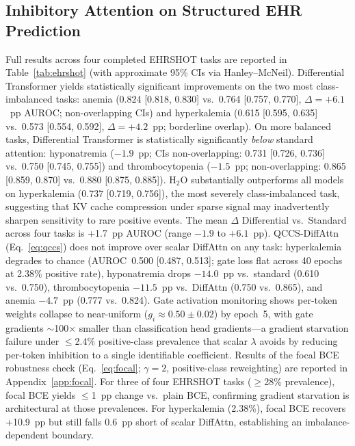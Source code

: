 \documentclass{article}
\begin{document}
\subsection{Inhibitory Attention on Structured EHR Prediction}

Full results across four completed EHRSHOT tasks are reported in
Table~\ref{tab:ehrshot} (with approximate 95\% CIs via Hanley--McNeil). Differential
Transformer yields statistically significant improvements on the two most
class-imbalanced tasks: anemia (0.824 [0.818, 0.830] vs.\ 0.764 [0.757, 0.770],
$\Delta{=}{+}6.1$~pp AUROC; non-overlapping CIs) and hyperkalemia (0.615 [0.595, 0.635]
vs.\ 0.573 [0.554, 0.592], $\Delta{=}{+}4.2$~pp; borderline overlap).
On more balanced tasks, Differential Transformer is statistically significantly
\emph{below} standard attention: hyponatremia ($-1.9$~pp; CIs non-overlapping:
0.731 [0.726, 0.736] vs.\ 0.750 [0.745, 0.755]) and thrombocytopenia
($-1.5$~pp; non-overlapping: 0.865 [0.859, 0.870] vs.\ 0.880 [0.875, 0.885]).
H$_2$O substantially outperforms all models on hyperkalemia (0.737 [0.719, 0.756]),
the most severely class-imbalanced task, suggesting that KV cache compression
under sparse signal may inadvertently sharpen sensitivity to rare positive events.
The mean $\Delta$ Differential vs.\ Standard across four tasks is +1.7~pp AUROC
(range $-1.9$ to $+6.1$~pp). QCCS-DiffAttn (Eq.~\ref{eq:qccs}) does not improve
over scalar DiffAttn on any task: hyperkalemia degrades to chance (AUROC~0.500
[0.487, 0.513]; gate loss flat across 40 epochs at 2.38\% positive rate),
hyponatremia drops $-14.0$~pp vs.\ standard (0.610 vs.\ 0.750), thrombocytopenia
$-11.5$~pp vs.\ DiffAttn (0.750 vs.\ 0.865), and anemia $-4.7$~pp (0.777 vs.\ 0.824).
Gate activation monitoring shows per-token weights collapse to near-uniform
($g_i \approx 0.50 \pm 0.02$) by epoch~5, with gate gradients $\sim$100$\times$
smaller than classification head gradients---a gradient starvation failure
under $\leq$2.4\% positive-class prevalence that scalar $\lambda$ avoids by
reducing per-token inhibition to a single identifiable coefficient.
Results of the focal BCE robustness check (Eq.~\ref{eq:focal}; $\gamma=2$,
positive-class reweighting) are reported in Appendix~\ref{app:focal}. For three
of four EHRSHOT tasks ($\geq$28\% prevalence), focal BCE yields $\leq$1~pp change
vs.\ plain BCE, confirming gradient starvation is architectural at those prevalences.
For hyperkalemia (2.38\%), focal BCE recovers +10.9~pp but still falls 0.6~pp
short of scalar DiffAttn, establishing an imbalance-dependent boundary.
\end{document}
